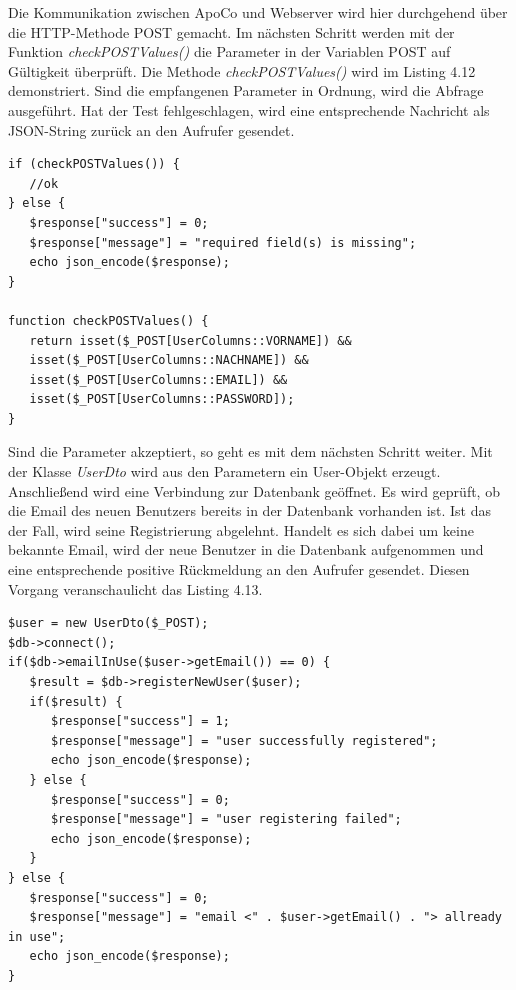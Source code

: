 Die Kommunikation zwischen ApoCo und Webserver wird hier durchgehend \"uber die HTTP-Methode POST gemacht.
Im n\"achsten Schritt werden mit der Funktion \emph{checkPOSTValues()} die Parameter in der 
Variablen POST auf G\"ultigkeit \"uberpr\"uft.
Die Methode \emph{checkPOSTValues()} wird im Listing 4.12 demonstriert.
Sind die empfangenen Parameter in Ordnung, wird die Abfrage ausgef\"uhrt.
Hat der Test fehlgeschlagen, wird eine entsprechende Nachricht als JSON-String zur\"uck an den Aufrufer gesendet.\\

\begin{lstlisting}[caption={Benuzter registrieren, Schritt 2}]
if (checkPOSTValues()) {
   //ok
} else {
   $response["success"] = 0;
   $response["message"] = "required field(s) is missing";
   echo json_encode($response);
}

function checkPOSTValues() {
   return isset($_POST[UserColumns::VORNAME]) &&
   isset($_POST[UserColumns::NACHNAME]) &&
   isset($_POST[UserColumns::EMAIL]) && 
   isset($_POST[UserColumns::PASSWORD]);
}
\end{lstlisting}

Sind die Parameter akzeptiert, so geht es mit dem n\"achsten Schritt weiter.
Mit der Klasse \emph{UserDto} wird aus den Parametern ein User-Objekt erzeugt.
Anschlie\ss{}end wird eine Verbindung zur Datenbank ge\"offnet.
Es wird gepr\"uft, ob die Email des neuen Benutzers bereits in der Datenbank vorhanden ist.
Ist das der Fall, wird seine Registrierung abgelehnt.
Handelt es sich dabei um keine bekannte Email, wird der neue Benutzer in die Datenbank aufgenommen 
und eine entsprechende positive R\"uckmeldung an den Aufrufer gesendet.
Diesen Vorgang veranschaulicht das Listing 4.13.\\

\begin{lstlisting}[caption={Benuzter registrieren, Schritt 3}]
$user = new UserDto($_POST);
$db->connect();
if($db->emailInUse($user->getEmail()) == 0) {
   $result = $db->registerNewUser($user);
   if($result) {
      $response["success"] = 1;
      $response["message"] = "user successfully registered";
      echo json_encode($response);
   } else {
      $response["success"] = 0;
      $response["message"] = "user registering failed";
      echo json_encode($response);
   }
} else { 
   $response["success"] = 0;
   $response["message"] = "email <" . $user->getEmail() . "> allready in use";
   echo json_encode($response);
}
\end{lstlisting}